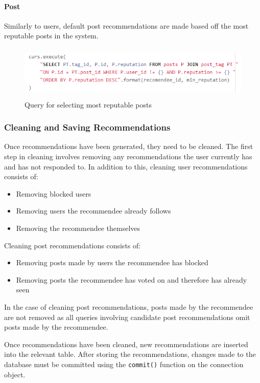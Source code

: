 \paragraph{Post}
Similarly to users, default post recommendations are made based off the most reputable posts in the system.

\begin{figure}[H]
\centering
\includegraphics[height=1in]{Images/Implementation/DefaultPosts}
\caption{Query for selecting most reputable posts}
\label{fig:DefaultPosts}
\end{figure}

\subsubsection{Cleaning and Saving Recommendations}
Once recommendations have been generated, they need to be cleaned. The first step in cleaning involves removing any recommendations the user currently has and has not responded to. In addition to this, cleaning user recommendations consists of:
\begin{itemize}
\item Removing blocked users
\item Removing users the recommendee already follows
\item Removing the recommendee themselves
\end{itemize}

\noindent Cleaning post recommendations consists of:
\begin{itemize}
\item Removing posts made by users the recommendee has blocked
\item Removing posts the recommendee has voted on and therefore has already seen
\end{itemize}

In the case of cleaning post recommendations, posts made by the recommendee are not removed as all queries involving candidate post recommendations omit posts made by the recommendee.

Once recommendations have been cleaned, new recommendations are inserted into the relevant table. After storing the recommendations, changes made to the database must be committed using the \texttt{commit()} function on the connection object.